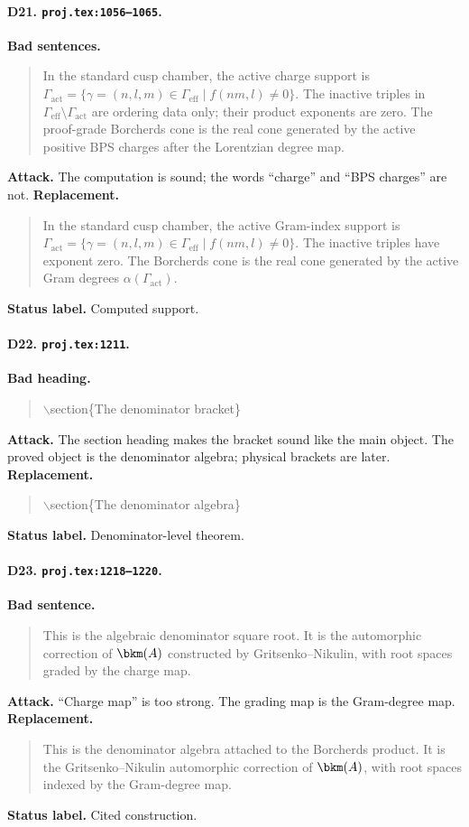 \paragraph{D21. \texttt{proj.tex:1056--1065}.}
\textbf{Bad sentences.}
\begin{quote}\small
In the standard cusp chamber, the active charge support is
\(\Gamma_{\mathrm{act}}=\{\gamma=(n,l,m)\in\Gamma_{\mathrm{eff}}\mid
f(nm,l)\neq0\}\).  The inactive triples in
\(\Gamma_{\mathrm{eff}}\setminus\Gamma_{\mathrm{act}}\) are ordering data
only; their product exponents are zero.  The proof-grade Borcherds cone
is the real cone generated by the active positive BPS charges after the
Lorentzian degree map.
\end{quote}
\textbf{Attack.}
The computation is sound; the words ``charge'' and ``BPS charges'' are
not.
\textbf{Replacement.}
\begin{quote}\small
In the standard cusp chamber, the active Gram-index support is
\(\Gamma_{\mathrm{act}}=\{\gamma=(n,l,m)\in\Gamma_{\mathrm{eff}}\mid
f(nm,l)\neq0\}\).  The inactive triples have exponent zero.  The
Borcherds cone is the real cone generated by the active Gram degrees
\(\alpha(\Gamma_{\mathrm{act}})\).
\end{quote}
\textbf{Status label.} Computed support.

\paragraph{D22. \texttt{proj.tex:1211}.}
\textbf{Bad heading.}
\begin{quote}\small
\(\backslash\)section\{The denominator bracket\}
\end{quote}
\textbf{Attack.}
The section heading makes the bracket sound like the main object.  The
proved object is the denominator algebra; physical brackets are later.
\textbf{Replacement.}
\begin{quote}\small
\(\backslash\)section\{The denominator algebra\}
\end{quote}
\textbf{Status label.} Denominator-level theorem.

\paragraph{D23. \texttt{proj.tex:1218--1220}.}
\textbf{Bad sentence.}
\begin{quote}\small
This is the algebraic denominator square root.  It is the automorphic
correction of \(\bkm(A)\) constructed by Gritsenko--Nikulin,
with root spaces graded by the charge map.
\end{quote}
\textbf{Attack.}
``Charge map'' is too strong.  The grading map is the Gram-degree map.
\textbf{Replacement.}
\begin{quote}\small
This is the denominator algebra attached to the Borcherds product.  It is
the Gritsenko--Nikulin automorphic correction of \(\bkm(A)\),
with root spaces indexed by the Gram-degree map.
\end{quote}
\textbf{Status label.} Cited construction.

